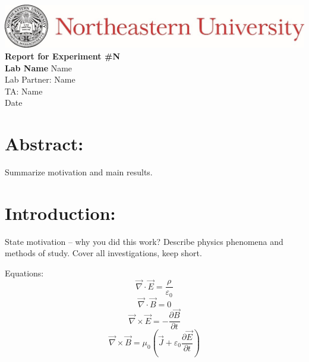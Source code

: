 \documentclass[12pt]{article}
\begin{document}
	\begin{center}
		\includegraphics{Header}
		\vfill		
		\textbf{\Large{Report for Experiment \#N\\
		Lab Name}}
		\vfill
		Name\\
		Lab Partner: Name\\
		TA: Name\\
		Date
		\vfill
	\end{center}
	
	\section*{Abstract:}
		Summarize motivation and main results.
	
	\newpage
	
	\section*{Introduction:}
		\begin{outline}[enumerate]
			\1 State motivation – why you did this work?
			\1 Describe physics phenomena and methods of study.
			\1 Cover all investigations, keep short.
		\end{outline}
		Equations:
		\[ \vec{\nabla} \cdot \vec{E} = \frac{\rho}{\varepsilon_0} \tag{1} \]
		\[ \vec{\nabla} \cdot \vec{B} = 0 \tag{2} \]
		\[ \vec{\nabla} \times \vec{E} = - \frac{\partial \vec{B}}{\partial t} \tag{3} \]
		\[ \vec{\nabla} \times \vec{B} = \mu_0 \left( \vec{J} + \varepsilon_0 \frac{\partial \vec{E}}{\partial t} \right) \tag{4} \]
	
\end{document}
